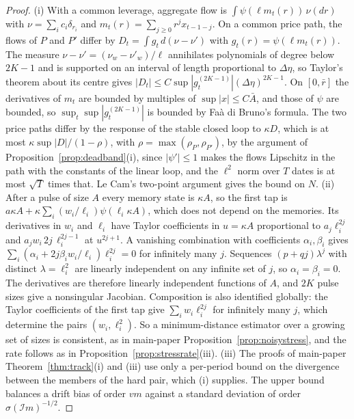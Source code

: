 \documentclass[12pt]{article}
\theoremstyle{definition}
\theoremstyle{remark}
\begin{document}
\begin{proof}
(i) With a common leverage, aggregate flow is $\int\psi(\ell m_t(r))\,\nu(dr)$ with $\nu=\sum_ic_i\delta_{r_i}$ and $m_t(r)=\sum_{j\ge0}r^jx_{t-1-j}$. On a common price path, the flows of $P$ and $P'$ differ by $D_t=\int g_t\,d(\nu-\nu')$ with $g_t(r)=\psi(\ell m_t(r))$. The measure $\nu-\nu'=(\nu_w-\nu'_w)/\ell$ annihilates polynomials of degree below $2K-1$ and is supported on an interval of length proportional to $\Delta\eta$, so Taylor's theorem about its centre gives $|D_t|\le C\sup|g_t^{(2K-1)}|(\Delta\eta)^{2K-1}$. On $[0,\bar r]$ the derivatives of $m_t$ are bounded by multiples of $\sup|x|\le C\bar A$, and those of $\psi$ are bounded, so $\sup_t\sup|g_t^{(2K-1)}|$ is bounded by Fa\`a di Bruno's formula. The two price paths differ by the response of the stable closed loop to $\kappa D$, which is at most $\kappa\sup|D|/(1-\rho)$, with $\rho=\max(\rho_P,\rho_{P'})$, by the argument of Proposition~\ref{prop:deadband}(i), since $|\psi'|\le1$ makes the flows Lipschitz in the path with the constants of the linear loop, and the $\ell^2$ norm over $T$ dates is at most $\sqrt T$ times that. Le Cam's two-point argument gives the bound on $N$. (ii) After a pulse of size $A$ every memory state is $\kappa A$, so the first tap is $a\kappa A+\kappa\sum_i(w_i/\ell_i)\psi(\ell_i\kappa A)$, which does not depend on the memories. Its derivatives in $w_i$ and $\ell_i$ have Taylor coefficients in $u=\kappa A$ proportional to $a_j\ell_i^{2j}$ and $a_jw_i\,2j\,\ell_i^{2j-1}$ at $u^{2j+1}$. A vanishing combination with coefficients $\alpha_i,\beta_i$ gives $\sum_i(\alpha_i+2j\beta_iw_i/\ell_i)\ell_i^{2j}=0$ for infinitely many $j$. Sequences $(p+qj)\lambda^j$ with distinct $\lambda=\ell_i^2$ are linearly independent on any infinite set of $j$, so $\alpha_i=\beta_i=0$. The derivatives are therefore linearly independent functions of $A$, and $2K$ pulse sizes give a nonsingular Jacobian. Composition is also identified globally: the Taylor coefficients of the first tap give $\sum_iw_i\ell_i^{2j}$ for infinitely many $j$, which determine the pairs $(w_i,\ell_i^2)$. So a minimum-distance estimator over a growing set of sizes is consistent, as in main-paper Proposition~\ref{prop:noisystress}, and the rate follows as in Proposition~\ref{prop:stressrate}(iii). (iii) The proofs of main-paper Theorem~\ref{thm:track}(i) and (iii) use only a per-period bound on the divergence between the members of the hard pair, which (i) supplies. The upper bound balances a drift bias of order $vm$ against a standard deviation of order $\sigma(\mathcal Im)^{-1/2}$.
\end{proof}
\end{document}
